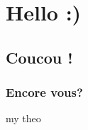 \documentclass[11pt]{book}
\begin{document}
\newpage
{}



\mainmatter
\pagestyle{main}


\chapter{Hello :)}
\section{Coucou !}
\subsection{Encore vous?}

\lipsum 


\begin{definition}[my def]
\lipsum
\end{definition}


\begin{theoreme}[label = thrm:X]{my theo}
\lipsum
\end{theoreme}

\begin{demo}{}{}
\lipsum
\end{demo}

\begin{ajoutationV}{}{}
\lipsum
\end{ajoutationV}
\end{document}
